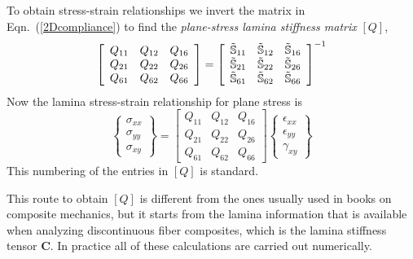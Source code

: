 \documentclass[11pt]{article}
\begin{document}
 To obtain stress-strain relationships we invert the matrix in Eqn.~(\ref{2Dcompliance}) to find the \emph{plane-stress lamina stiffness matrix} $[Q]$,
 \begin{equation}
   \left[ \begin{array}{ccc}
     Q_{11} &  Q_{12} &   Q_{16} \\
     Q_{21} &  Q_{22} &   Q_{26} \\
     Q_{61} &  Q_{62} &   Q_{66} 
    \end{array} \right] 
    =
              \left[ \begin{array}{ccc}
     \tilde{\mathbb{S}}_{11} &  \tilde{\mathbb{S}}_{12} &   \tilde{\mathbb{S}}_{16} \\
     \tilde{\mathbb{S}}_{21} &  \tilde{\mathbb{S}}_{22} &   \tilde{\mathbb{S}}_{26} \\
     \tilde{\mathbb{S}}_{61} &  \tilde{\mathbb{S}}_{62} &   \tilde{\mathbb{S}}_{66} 
    \end{array} \right]  ^{-1}
    \label{Qdef}
 \end{equation}
 Now the lamina stress-strain relationship for plane stress is
 \begin{equation}
    \left\{ \begin{array}{c}
           \sigma_{xx}  \\  \sigma_{yy}  \\   \sigma_{xy}
           \end{array} \right\}
           =
              \left[ \begin{array}{ccc}
     Q_{11} &  Q_{12} &   Q_{16} \\
     Q_{21} &  Q_{22} &   Q_{26} \\
     Q_{61} &  Q_{62} &   Q_{66} 
    \end{array} \right] 
        \left\{ \begin{array}{c}
           \epsilon_{xx}  \\  \epsilon_{yy}  \\  \gamma_{xy}
           \end{array} \right\}
     \label{laminaQ}
 \end{equation}
This numbering of the entries in $[Q]$ is standard.  

This route to obtain $[Q]$ is different from the ones usually used in books on composite mechanics, but it starts from the lamina information that is available when analyzing discontinuous fiber composites, which is the lamina stiffness tensor $\mathbf{C}$.  In practice all of these calculations are carried out numerically.
\end{document}
